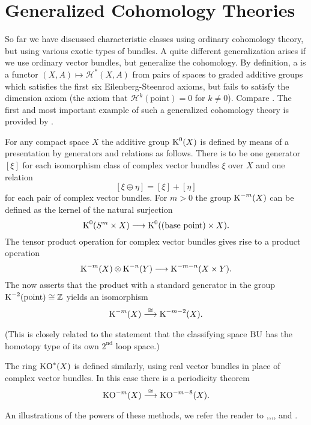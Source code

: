 \documentclass[../main]{subfiles}
\begin{document}
\section{Generalized Cohomology Theories}
So far we have discussed characteristic classes using ordinary cohomology theory, but using various exotic types of bundles. A quite different generalization arises if we use ordinary vector bundles, but generalize the cohomology. By definition, a  is a functor \newline $(X, A) \mapsto {\mathcal H}^\ast(X, A)$ from pairs of spaces to graded additive groups which satisfies the first six Eilenberg-Steenrod axioms, but fails to satisfy the dimension axiom (the axiom that ${\mathcal H}^k(\text{point}) = 0$ for $k \ne 0$). Compare \cite{dyer1969cohomology}. The first and most important example of such a generalized cohomology theory is provided by . 

\begin{definition}
For any compact space $X$ the additive group $\operatorname{K}^0(X)$ is defined by means of a presentation by generators and relations as follows. There is to be one generator $[\xi]$ for each isomorphism class of complex vector bundles $\xi$ over $X$ and one relation \[[\xi \oplus \eta] = [\xi] + [\eta]\] for each pair of complex vector bundles. For $m > 0$ the group $\operatorname{K}^{-m}(X)$ can be defined as the kernel of the natural surjection \[\operatorname{K}^0(S^m \times X) \longrightarrow \operatorname{K}^0((\text{base point}) \times X).\] The tensor product operation for complex vector bundles gives rise to a product operation \[\operatorname{K}^{-m}(X) \otimes \operatorname{K}^{-n}(Y) \longrightarrow \operatorname{K}^{-m - n}(X \times Y).\] The  now asserts that the product with a standard generator in the group $\operatorname{K}^{-2}(\text{point}) \cong \mathbb Z$ yields an isomorphism \[\K^{-m}(X) \varrightarrow{\cong} \K^{-m - 2}(X).\] (This is closely related to the statement that the classifying space $\operatorname{BU}$ has the homotopy type of its own $2^{\text{nd}}$ loop space.) 
\end{definition}

The ring $\operatorname{KO}^\ast(X)$ is defined similarly, using real vector bundles in place of complex vector bundles. In this case there is a periodicity theorem \[\KO^{-m}(X) \varrightarrow{\cong} \KO^{-m - 8}(X).\] An illustrations of the powers of these methods, we refer the reader to \cite{atiyah1967},\cite{adams1960},\cite{adams1962},\newline \cite{adams1965},\cite{adams1966} and \cite{adams1972}. 
\end{document}
